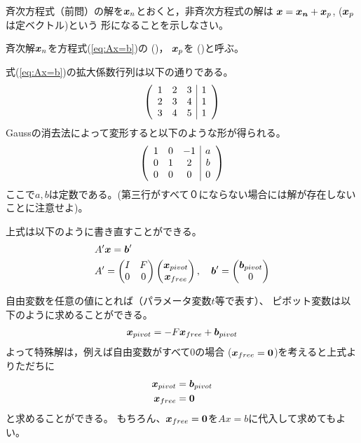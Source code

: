 \documentclass[twocolumn,11pt]{jarticle}
\begin{document}
\nquestion
斉次方程式（前問）の解を$\boldsymbol{x}_n$とおくと，非斉次方程式の解は
$\boldsymbol{x}=\boldsymbol{x_n}+\boldsymbol{x}_p$, ($\boldsymbol{x}_p$は定ベクトル)という
形になることを示しなさい。

\comment
斉次解$\boldsymbol{x}_{n}$を方程式(\ref{eq:Ax=b})の
()，
$\boldsymbol{x}_p$を
()と呼ぶ。

式(\ref{eq:Ax=b})の拡大係数行列は以下の通りである。
\begin{align}
  \left(
  \begin{array}{ccc|c}
    1 & 2 & 3 & 1 \\
    2 & 3 & 4 & 1 \\
    3 & 4 & 5 & 1
  \end{array}\right)\notag
\end{align}
Gaussの消去法によって変形すると以下のような形が得られる。
\begin{align}
  \left(
  \begin{array}{ccc|c}
    1 & 0  & -1 & a\\
    0 & 1  & 2  & b\\
    0 & 0  & 0  & 0
  \end{array}\right)\notag
\end{align}
ここで$a,b$は定数である。(第三行がすべて０にならない場合には解が存在しない
ことに注意せよ)。

上式は以下のように書き直すことができる。
\begin{align}
  &A'\boldsymbol{x}=\boldsymbol{b}'\label{eq:A'x=b'}\\
  &A'=
  \begin{pmatrix}
    I  & F \\
    0  & 0
  \end{pmatrix}
  \begin{pmatrix}
    \boldsymbol{x}_{pivot}\\
    \boldsymbol{x}_{free}
  \end{pmatrix},\quad
  \boldsymbol{b}'=
  \begin{pmatrix}
    \boldsymbol{b}_{pivot} \\ 0
  \end{pmatrix}\notag
\end{align}

自由変数を任意の値にとれば（パラメータ変数$t$等で表す）、
ピボット変数は以下のように求めることができる。
\begin{align}
  \boldsymbol{x}_{pivot}=-F\boldsymbol{x}_{free}+\boldsymbol{b}_{pivot}
\end{align}
よって特殊解は，例えば自由変数がすべて$0$の場合
($\boldsymbol{x}_{free}=\boldsymbol{0}$)を考えると上式よりただちに
\begin{align}
\boldsymbol{x}_{pivot}&=\boldsymbol{b}_{pivot}\\
\boldsymbol{x}_{free}&=\boldsymbol{0}
\end{align}
と求めることができる。
もちろん、$\boldsymbol{x}_{free}=\boldsymbol{0}$を$Ax=b$に代入して求めてもよい。
\end{document}
